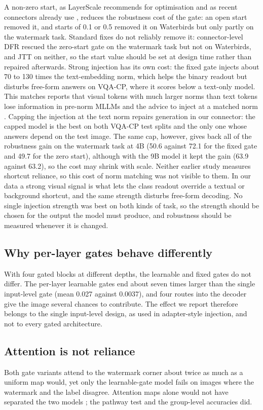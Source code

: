 A non-zero start, as LayerScale recommends for optimisation \citep{touvron2021cait} and as recent connectors already use
\citep{lialin2023scalable,yan2026dgp}, reduces the robustness cost of the gate: an open start removed it, and starts of
0.1 or 0.5 removed it on Waterbirds but only partly on the watermark task. Standard fixes do not reliably remove it:
connector-level DFR rescued the zero-start gate on the watermark task but not on Waterbirds, and JTT on neither, so
the start value should be set at design time rather than repaired afterwards.
Strong injection has its own cost: the fixed gate injects about 70 to 130 times the text-embedding norm, which helps
the binary readout but disturbs free-form answers on VQA-CP, where it scores below a text-only model. This matches
reports that visual tokens with much larger norms than text tokens lose information in pre-norm MLLMs
\citep{li2025unseen} and the advice to inject at a matched norm \citep{farazi2026gate}. Capping the injection at the text norm
repairs generation in our connector: the capped model is the best on both VQA-CP test splits and the only one whose
answers depend on the test image. The same cap, however, gives back all of the robustness gain on the watermark
task at 4B (50.6 against 72.1 for the fixed gate and 49.7 for the zero start), although with the 9B model it kept the gain (63.9 against 63.2), so the cost may
shrink with scale. Neither earlier study measures shortcut reliance, so this cost of norm matching was not
visible to them. In our data a strong visual signal is what lets the class readout override a textual or
background shortcut, and the same strength disturbs free-form decoding. No single injection strength was best on
both kinds of task, so the strength should be chosen for the output the model must produce, and robustness should
be measured whenever it is changed.

\subsection{Why per-layer gates behave differently}

With four gated blocks at different depths, the learnable and fixed gates do not differ. The per-layer learnable gates
end about seven times larger than the single input-level gate (mean 0.027 against 0.0037), and four routes into the
decoder give the image several chances to contribute. The effect we report therefore belongs to the single
input-level design, as used in adapter-style injection, and not to every gated architecture.

\subsection{Attention is not reliance}

Both gate variants attend to the watermark corner about twice as much as a uniform map would, yet only the
learnable-gate model fails on images where the watermark and the label disagree. Attention maps alone would not have
separated the two models \citep{jain2019attention,wiegreffe2019attention}; the pathway test and the group-level accuracies
did.
